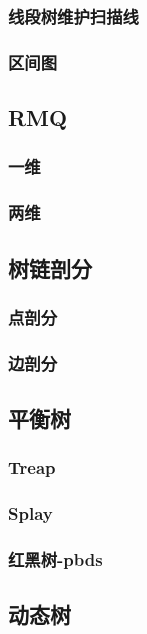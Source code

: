 \documentclass[twocolumn,a4]{article}
\newcommand{\addcpp}[1]{}
\begin{document}
		\subsubsection{线段树维护扫描线}
			\addcpp{datastruct/scanline} %
		\subsubsection{区间图}
			\addcpp{datastruct/interval_dij}
	\subsection{RMQ}
		\subsubsection{一维}
			\addcpp{datastruct/ST}
		\subsubsection{两维}
	\subsection{树链剖分}
		\subsubsection{点剖分}
			\addcpp{datastruct/heavy_light_decomposition}
		\subsubsection{边剖分}
	\subsection{平衡树}
		\subsubsection{Treap}
			\addcpp{datastruct/treap}
		\subsubsection{Splay}
		\subsubsection{红黑树-pbds}
			\addcpp{datastruct/rbt_pbds}
	\subsection{动态树}
\end{document}

